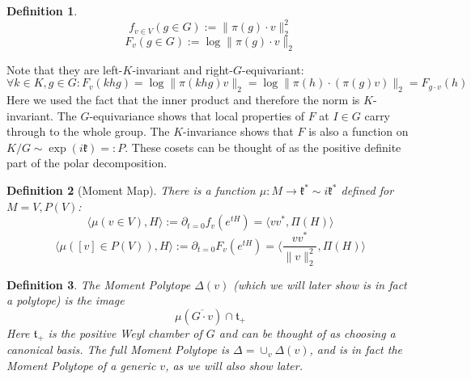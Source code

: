 \documentclass{article}
\newtheorem{definition}{Definition}
\begin{document}
\begin{definition} 
\[ f_{v \in V}(g \in G) := \|\pi(g) \cdot v\|_{2}^{2} \]
\[ F_{v}(g \in G) := \log \|\pi(g) \cdot v\|_{2}  \]
\end{definition}
Note that they are left-$K$-invariant and right-$G$-equivariant:
\[ \forall k \in K, g \in G: F_{v}(khg) = \log \|\pi(khg) v\|_{2} = \log \|\pi(h) \cdot (\pi(g) v)\|_{2} = F_{g \cdot v}(h)   \]
Here we used the fact that the inner product and therefore the norm is $K$-invariant. The $G$-equivariance shows that local properties of $F$ at $I \in G$ carry through to the whole group. The $K$-invariance shows that $F$ is also a function on $K/G \sim \exp(i \mathfrak{k}) =: P$. These cosets can be thought of as the positive definite part of the polar decomposition. 

\begin{definition} [Moment Map]
There is a function $\mu : M \to \mathfrak{k}^{*} \sim i \mathfrak{k}^{*}$ defined for $M = V,P(V)$:
\[ \langle \mu(v \in V), H \rangle := \partial_{t=0} f_{v}(e^{tH}) = \langle v v^{*}, \Pi(H) \rangle   \]
\[ \langle \mu([v] \in P(V)), H \rangle := \partial_{t=0} F_{v}(e^{tH}) = \langle \frac{v v^{*}}{\|v\|_{2}^{2}}, \Pi(H) \rangle  \]
\end{definition}

\begin{definition}
The Moment Polytope $\Delta(v)$ (which we will later show is in fact a polytope) is the image
\[ \mu(\overline{G \cdot v}) \cap \mathfrak{t}_{+}   \]
Here $\mathfrak{t}_{+}$ is the positive Weyl chamber of $G$ and can be thought of as choosing a canonical basis. The full Moment Polytope is $\Delta = \cup_{v} \Delta(v)$, and is in fact the Moment Polytope of a generic $v$, as we will also show later. 
\end{definition}
\end{document}
